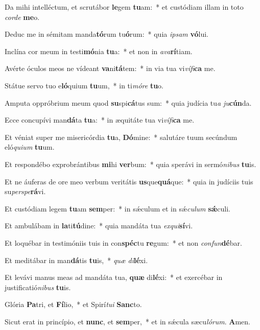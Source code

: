 ﻿\item Da mihi intelléctum, et scrutábor \textbf{le}gem \textbf{tu}am:~* et custódiam illam in toto \emph{cor}\emph{de} \textbf{me}o.

\item Deduc me in sémitam manda\textbf{tó}rum tu\textbf{ó}rum:~* quia \emph{ip}\emph{sam} \textbf{vó}lui.

\item Inclína cor meum in testi\textbf{mó}nia \textbf{tu}a:~* et non in \emph{a}\emph{va}\textbf{rí}tiam.

\item Avérte óculos meos ne vídeant \textbf{va}ni\textbf{tá}tem:~* in via tua vi\emph{ví}\emph{fi}\textbf{ca} me.

\item Státue servo tuo e\textbf{ló}quium \textbf{tu}um,~* in ti\emph{mó}\emph{re} \textbf{tu}o.

\item Amputa oppróbrium meum quod \textbf{su}spi\textbf{cá}tus sum:~* quia judícia tu\emph{a} \emph{ju}\textbf{cún}da.

\item Ecce concupívi man\textbf{dá}ta \textbf{tu}a:~* in æquitáte tua vi\emph{ví}\emph{fi}\textbf{ca} me.

\item Et véniat super me misericórdia \textbf{tu}a, \textbf{Dó}mine:~* salutáre tuum secúndum eló\emph{qui}\emph{um} \textbf{tu}um.

\item Et respondébo exprobrántibus \textbf{mi}hi \textbf{ver}bum:~* quia sperávi in sermó\emph{ni}\emph{bus} \textbf{tu}is.

\item Et ne áuferas de ore meo verbum veritátis \textbf{us}que\textbf{quá}que:~* quia in judíciis tuis su\emph{per}\emph{spe}\textbf{rá}vi.

\item Et custódiam legem \textbf{tu}am \textbf{sem}per:~* in sǽculum et in sǽ\emph{cu}\emph{lum} \textbf{sǽ}culi.

\item Et ambulábam in \textbf{la}ti\textbf{tú}dine:~* quia mandáta tua \emph{ex}\emph{qui}\textbf{sí}vi.

\item Et loquébar in testimóniis tuis in con\textbf{spéc}tu \textbf{re}gum:~* et non \emph{con}\emph{fun}\textbf{dé}bar.

\item Et meditábar in man\textbf{dá}tis \textbf{tu}is,~* \emph{quæ} \emph{di}\textbf{lé}xi.

\item Et levávi manus meas ad mandáta tua, \textbf{quæ} di\textbf{lé}xi:~* et exercébar in justificatió\emph{ni}\emph{bus} \textbf{tu}is.

\item Glória \textbf{Pa}tri, et \textbf{Fí}lio,~* et Spirí\emph{tu}\emph{i} \textbf{Sanc}to.

\item Sicut erat in princípio, et \textbf{nunc}, et \textbf{sem}per,~* et in sǽcula sæcu\emph{ló}\emph{rum}. \textbf{A}men.